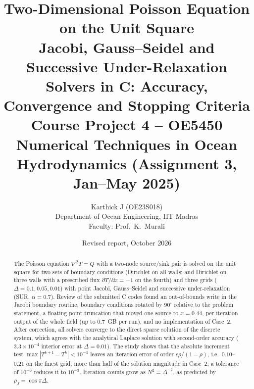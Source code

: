 
\title{\textbf{Two-Dimensional Poisson Equation on the Unit Square}\\[2pt]\large Jacobi, Gauss--Seidel and Successive Under-Relaxation Solvers in C: Accuracy, Convergence and Stopping Criteria\\[2pt]\normalsize Course Project 4 -- OE5450 Numerical Techniques in Ocean Hydrodynamics (Assignment 3, Jan--May 2025)}
\author{Karthick J (OE23S018)\\Department of Ocean Engineering, IIT Madras\\Faculty: Prof.\ K.\ Murali}
\date{Revised report, October 2026}
\maketitle
\begin{abstract}
The Poisson equation $\nabla^2T=Q$ with a two-node source/sink pair is solved on the unit square for two sets of boundary conditions (Dirichlet on all walls; and Dirichlet on three walls with a prescribed flux $\partial T/\partial x=-1$ on the fourth) and three grids ($\Delta=0.1,0.05,0.01$) with point Jacobi, Gauss--Seidel and successive under-relaxation (SUR, $\alpha=0.7$). Review of the submitted C codes found an out-of-bounds write in the Jacobi boundary routine, boundary conditions rotated by $90^\circ$ relative to the problem statement, a floating-point truncation that moved one source to $x=0.44$, per-iteration output of the whole field (up to 0.7~GB per run), and no implementation of Case~2. After correction, all solvers converge to the direct sparse solution of the discrete system, which agrees with the analytical Laplace solution with second-order accuracy ($3.3\times10^{-4}$ interior error at $\Delta=0.01$). The study shows that the absolute increment test $\max|T^{k+1}-T^k|<10^{-4}$ leaves an iteration error of order $\epsilon\rho/(1-\rho)$, i.e.\ $0.10$--$0.21$ on the finest grid, more than half of the solution magnitude in Case~2; a tolerance of $10^{-6}$ reduces it to $10^{-3}$. Iteration counts grow as $N^2=\Delta^{-2}$, as predicted by $\rho_J=\cos\pi\Delta$.
\end{abstract}
\tableofcontents\newpage

